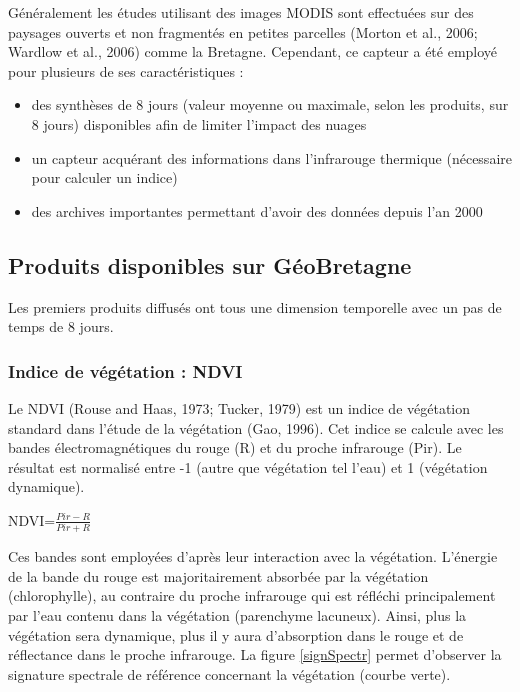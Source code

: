 \documentclass[10pt,a4paper]{article}
\begin{document}
Généralement les études utilisant des images MODIS sont effectuées sur des paysages ouverts et non fragmentés en petites parcelles (Morton et al., 2006; Wardlow et al., 2006) comme la Bretagne. Cependant, ce capteur a été employé pour plusieurs de ses caractéristiques :
\begin{itemize}
\item des synthèses de 8 jours (valeur moyenne ou maximale, selon les produits, sur 8 jours) disponibles afin de limiter l'impact des nuages
\item un capteur acquérant des informations dans l'infrarouge thermique (nécessaire pour calculer un indice)
\item des archives importantes permettant d'avoir des données depuis l'an 2000
\end{itemize}

\subsection{Produits disponibles sur GéoBretagne}

Les premiers produits diffusés ont tous une dimension temporelle avec un pas de temps de 8 jours.

\subsubsection{Indice de végétation : NDVI}

Le NDVI (Rouse and Haas, 1973; Tucker, 1979) est un indice de végétation standard dans l'étude de la végétation (Gao, 1996). Cet indice se calcule avec les bandes électromagnétiques du rouge (R) et du proche infrarouge (Pir). Le résultat est normalisé entre -1 (autre que végétation tel l'eau) et 1 (végétation dynamique).\smallbreak

\begin{center}
\textrm{NDVI}=$ \frac{Pir-R}{Pir+R} $
\end{center}\smallbreak

Ces bandes sont employées d'après leur interaction avec la végétation. L'énergie de la bande du rouge est majoritairement absorbée par la végétation (chlorophylle), au contraire du proche infrarouge qui est réfléchi principalement par l'eau contenu dans la végétation (parenchyme lacuneux). Ainsi, plus la végétation sera dynamique, plus il y aura d'absorption dans le rouge et de réflectance dans le proche infrarouge. La figure \ref{signSpectr} permet d'observer la signature spectrale de référence concernant la végétation (courbe verte).\smallbreak
\end{document}

